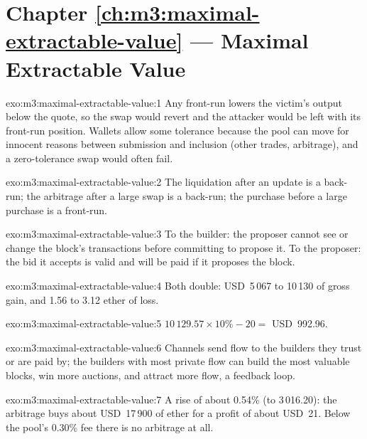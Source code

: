 \section*{Chapter \ref{ch:m3:maximal-extractable-value} --- Maximal Extractable Value}

\begin{solution}{exo:m3:maximal-extractable-value:1}
Any front-run lowers the victim's output below the quote, so the swap would revert and the attacker would be left with
its front-run position. Wallets allow some tolerance because the pool can move for innocent reasons between submission and
inclusion (other trades, arbitrage), and a zero-tolerance swap would often fail.
\end{solution}

\begin{solution}{exo:m3:maximal-extractable-value:2}
The liquidation after an  update is a back-run; the arbitrage after a large swap is a back-run; the purchase before a
large purchase is a front-run.
\end{solution}

\begin{solution}{exo:m3:maximal-extractable-value:3}
To the builder: the proposer cannot see or change the block's transactions before committing to propose it. To the
proposer: the bid it accepts is valid and will be paid if it proposes the block.
\end{solution}

\begin{solution}{exo:m3:maximal-extractable-value:4}
Both double: USD~5\,067 to 10\,130 of gross gain, and 1.56 to 3.12 ether of loss.
\end{solution}

\begin{solution}{exo:m3:maximal-extractable-value:5}
$10\,129.57 \times 10\% - 20 = $ USD~992.96.
\end{solution}

\begin{solution}{exo:m3:maximal-extractable-value:6}
Channels send flow to the builders they trust or are paid by; the builders with most private flow can build the most valuable
blocks, win more auctions, and attract more flow, a feedback loop.
\end{solution}

\begin{solution}{exo:m3:maximal-extractable-value:7}
A rise of about 0.54\% (to 3\,016.20): the arbitrage buys about USD~17\,900 of ether for a profit of about USD~21. Below the
pool's 0.30\% fee there is no arbitrage at all.
\end{solution}

